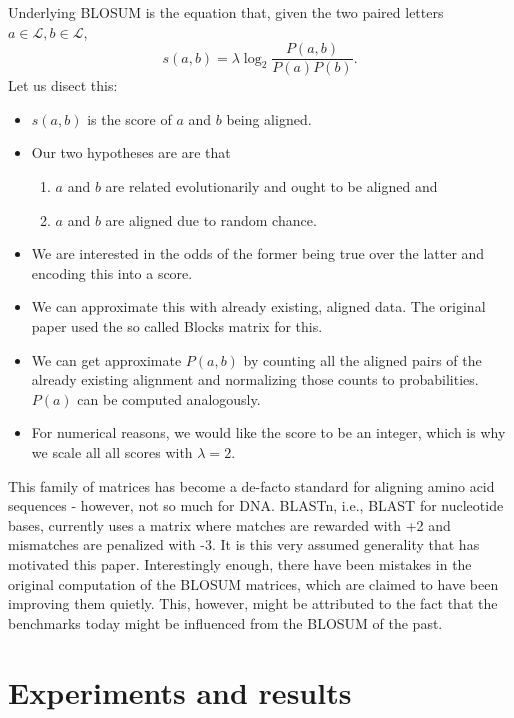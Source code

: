 \documentclass{article}
\begin{document}
Underlying BLOSUM is the equation that, given the two paired letters $a \in
    \mathcal L, b \in \mathcal L$,
\begin{equation*}
    s(a, b)= \lambda \log_2 \frac{P(a, b)}{P(a)P(b)}.
\end{equation*}
Let us disect this:
\begin{itemize}
    \item $s(a, b)$ is the score of $a$ and $b$ being aligned.
    \item Our two hypotheses are are that
          \begin{enumerate}
              \item $a$ and $b$ are related evolutionarily and ought to be
                    aligned and
              \item $a$ and $b$ are aligned due to random chance.
          \end{enumerate}
    \item We are interested in the odds of the former being true over the
          latter and encoding this into a score.
    \item We can approximate this with already existing, aligned data. The
          original paper used the so called Blocks matrix for this.
    \item We can get approximate $P(a,b)$ by counting all the aligned pairs of
          the already existing alignment and normalizing those counts to
          probabilities. $P(a)$ can be computed analogously.
    \item For numerical reasons, we would like the score to be an integer,
          which is why we scale all all scores with $\lambda = 2$.
\end{itemize}
This family of matrices has become a de-facto standard for aligning amino acid
sequences - however, not so much for DNA. BLASTn, i.e., BLAST for nucleotide bases, currently uses a matrix where
matches are rewarded with +2 and mismatches are penalized with -3. It is this very assumed generality that has motivated this paper.
Interestingly enough, there have been
mistakes in the original computation of the BLOSUM matrices, which are claimed
to have been improving them quietly. This, however, might be attributed to the
fact that the benchmarks today might be influenced from the BLOSUM of the past.


\section*{Experiments and results}
\end{document}
